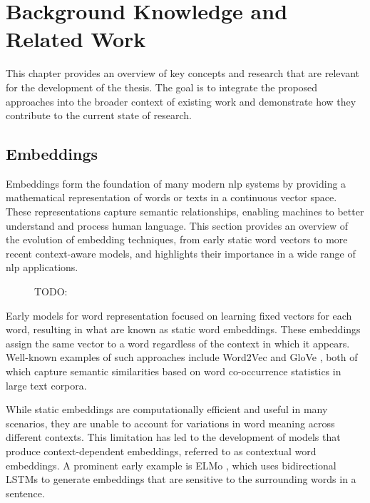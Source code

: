 \chapter{Background Knowledge and Related Work}
\label{sec:background}

This chapter provides an overview of key concepts and research that are relevant for the development of the thesis. The goal is to integrate the proposed approaches into the broader context of existing work and demonstrate how they contribute to the current state of research.

\section{Embeddings}
\label{sec:background:embeddings}
Embeddings form the foundation of many modern \ac{nlp} systems by providing a mathematical representation of words or texts in a continuous vector space. These representations capture semantic relationships, enabling machines to better understand and process human language. This section provides an overview of the evolution of embedding techniques, from early static word vectors to more recent context-aware models, and highlights their importance in a wide range of \ac{nlp} applications.

\begin{figure}[ht]
  \begin{center}
    
  \end{center}
  \caption{TODO:}
  \label{fig:embeddings} %
\end{figure}

Early models for word representation focused on learning fixed vectors for each word, resulting in what are known as static word embeddings. These embeddings assign the same vector to a word regardless of the context in which it appears. Well-known examples of such approaches include Word2Vec \cite{mikolovEfficientEstimationWord2013} and GloVe \cite{penningtonGloveGlobalVectors2014}, both of which capture semantic similarities based on word co-occurrence statistics in large text corpora.

While static embeddings are computationally efficient and useful in many scenarios, they are unable to account for variations in word meaning across different contexts. This limitation has led to the development of models that produce context-dependent embeddings, referred to as contextual word embeddings. A prominent early example is ELMo \cite{petersDeepContextualizedWord2018}, which uses bidirectional LSTMs to generate embeddings that are sensitive to the surrounding words in a sentence.

